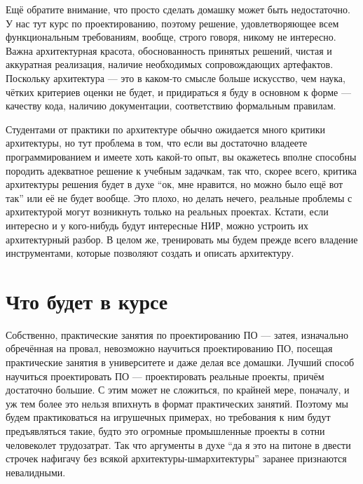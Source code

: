 \documentclass[a5paper]{article}
\begin{document}
Ещё обратите внимание, что просто сделать домашку может быть недостаточно. У нас тут курс по проектированию, поэтому решение, удовлетворяющее всем функциональным требованиям, вообще, строго говоря, никому не интересно. Важна архитектурная красота, обоснованность принятых решений, чистая и аккуратная реализация, наличие необходимых сопровождающих артефактов. Поскольку архитектура --- это в каком-то смысле больше искусство, чем наука, чётких критериев оценки не будет, и придираться я буду в основном к форме --- качеству кода, наличию документации, соответствию формальным правилам. 

Студентами от практики по архитектуре обычно ожидается много критики архитектуры, но тут проблема в том, что если вы достаточно владеете программированием и имеете хоть какой-то опыт, вы окажетесь вполне способны породить адекватное решение к учебным задачкам, так что, скорее всего, критика архитектуры решения будет в духе ``ок, мне нравится, но можно было ещё вот так'' или её не будет вообще. Это плохо, но делать нечего, реальные проблемы с архитектурой могут возникнуть только на реальных проектах. Кстати, если интересно и у кого-нибудь будут интересные НИР, можно устроить их архитектурный разбор. В целом же, тренировать мы будем прежде всего владение инструментами, которые позволяют создать и описать архитектуру.

\section{Что будет в курсе}

Собственно, практические занятия по проектированию ПО --- затея, изначально обречённая на провал, невозможно научиться проектированию ПО, посещая практические занятия в университете и даже делая все домашки. Лучший способ научиться проектировать ПО --- проектировать реальные проекты, причём достаточно большие. С этим может не сложиться, по крайней мере, поначалу, и уж тем более это нельзя впихнуть в формат практических занятий. Поэтому мы будем практиковаться на игрушечных примерах, но требования к ним будут предъявляться такие, будто это огромные промышленные проекты в сотни человеколет трудозатрат. Так что аргументы в духе ``да я это на питоне в двести строчек нафигачу без всякой архитектуры-шмархитектуры'' заранее признаются невалидными. 
\end{document}
